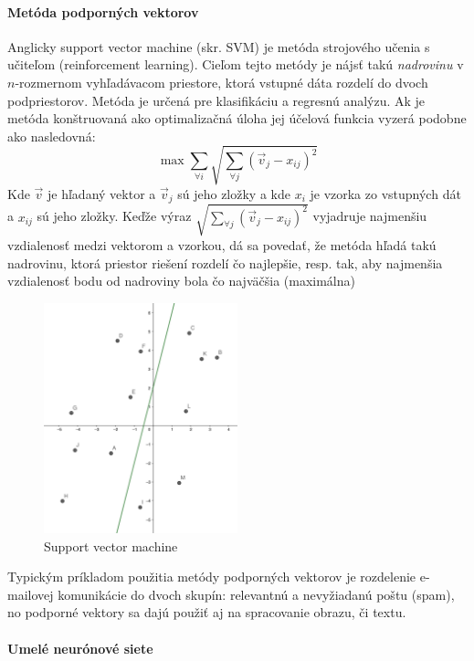 \paragraph{Metóda podporných vektorov}

Anglicky support vector machine (skr. SVM) je metóda strojového učenia s učiteľom (reinforcement
learning).\cite{support_vector_machine}
Cieľom tejto metódy je nájsť takú \emph{nadrovinu} v $n$-rozmernom vyhľadávacom priestore, ktorá vstupné dáta rozdelí
do dvoch podpriestorov.
Metóda je určená pre klasifikáciu a regresnú analýzu.
Ak je metóda konštruovaná ako optimalizačná úloha jej účelová funkcia vyzerá podobne ako nasledovná:
\begin{equation}
    \max \sum_{\forall i}{\sqrt{\sum_{\forall j}{(\vec{v}_j - x_{ij})^2}}}
\end{equation}
Kde $\vec{v}$ je hľadaný vektor a $\vec{v}_j$ sú jeho zložky a kde $x_i$ je vzorka zo vstupných dát a $x_{ij}$ sú jeho
zložky.
Keďže výraz $\sqrt{\sum_{\forall j}{(\vec{v}_j - x_{ij})^2}}$ vyjadruje najmenšiu vzdialenosť medzi vektorom a
vzorkou, dá sa povedať, že metóda hľadá takú nadrovinu, ktorá priestor riešení rozdelí čo najlepšie, resp. tak, aby
najmenšia vzdialenosť bodu od nadroviny bola čo najväčšia (maximálna)
\begin{figure}[H]
    \centering
    \includegraphics[width=0.5\textwidth]{images/svm.png}
    \caption{Support vector machine}
\end{figure}\label{figure:svm}

Typickým príkladom použitia metódy podporných vektorov je rozdelenie e-mailovej komunikácie do dvoch skupín: relevantnú
a nevyžiadanú poštu (spam), no podporné vektory sa dajú použiť aj na spracovanie obrazu, či textu.

\paragraph{Umelé neurónové siete}

